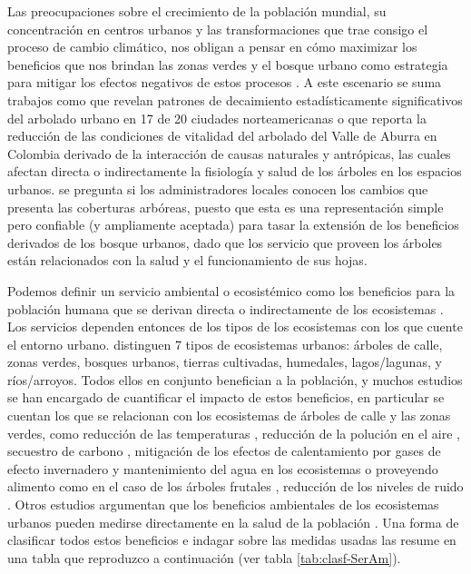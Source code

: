 \documentclass[12pt,]{book}
\begin{document}
Las preocupaciones sobre el crecimiento de la población mundial, su
concentración en centros urbanos y las transformaciones que trae consigo
el proceso de cambio climático, nos obligan a pensar en cómo maximizar
los beneficios que nos brindan las zonas verdes y el bosque urbano como
estrategia para mitigar los efectos negativos de estos procesos
\citep{nesbitt_exploring_2016, laredo_gestion_2011}. A este escenario se
suma trabajos como \citep{nowak_tree_2012} que revelan patrones de
decaimiento estadísticamente significativos del arbolado urbano en 17 de
20 ciudades norteamericanas o \citep{restrepo_incidence_2015} que
reporta la reducción de las condiciones de vitalidad del arbolado del
Valle de Aburra en Colombia derivado de la interacción de causas
naturales y antrópicas, las cuales afectan directa o indirectamente la
fisiología y salud de los árboles en los espacios urbanos.
\citet{nowak_tree_2012} se pregunta si los administradores locales
conocen los cambios que presenta las coberturas arbóreas, puesto que
esta es una representación simple pero confiable (y ampliamente
aceptada) para tasar la extensión de los beneficios derivados de los
bosque urbanos, dado que los servicio que proveen los árboles están
relacionados con la salud y el funcionamiento de sus hojas.

Podemos definir un servicio ambiental o ecosistémico como los beneficios
para la población humana que se derivan directa o indirectamente de los
ecosistemas \citep{bolund_ecosystem_1999}. Los servicios dependen
entonces de los tipos de los ecosistemas con los que cuente el entorno
urbano. \citet{bolund_ecosystem_1999} distinguen 7 tipos de ecosistemas
urbanos: árboles de calle, zonas verdes, bosques urbanos, tierras
cultivadas, humedales, lagos/lagunas, y ríos/arroyos. Todos ellos en
conjunto benefician a la población, y muchos estudios se han encargado
de cuantificar el impacto de estos beneficios, en particular se cuentan
los que se relacionan con los ecosistemas de árboles de calle y las
zonas verdes, como reducción de las temperaturas
\citep{ripoll_condiciones_2010}, reducción de la polución en el aire
\citep{duran_rivera_intercepcion_2009}, secuestro de carbono
\citep{nowak_carbon_2002, mcpherson2013new} , mitigación de los efectos
de calentamiento por gases de efecto invernadero
\citep{laredo_gestion_2011} y mantenimiento del agua en los ecosistemas
o proveyendo alimento como en el caso de los árboles frutales
\citep{konijnendijk_arboles_2005, nolazco_diversidad_2012}, reducción de
los niveles de ruido \citep{bolund_ecosystem_1999}. Otros estudios
argumentan que los beneficios ambientales de los ecosistemas urbanos
pueden medirse directamente en la salud de la población
\citep{bolund_ecosystem_1999, gomez-baggethun_classifying_2013}. Una
forma de clasificar todos estos beneficios e indagar sobre las medidas
usadas las resume \citet{gomez-baggethun_classifying_2013} en una tabla
que reproduzco a continuación (ver tabla \ref{tab:clasf-SerAm}).
\end{document}
